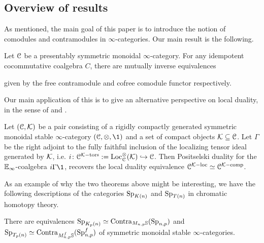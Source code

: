 \subsection*{Overview of results}

As mentioned, the main goal of this paper is to introduce the notion of comodules and contramodules in $\infty$-categories. Our main result is the following. 

\begin{introthm}
    \label{ch2:introthm:A}
    Let $\EuScript{C}$ be a presentably symmetric monoidal $\infty$-category. For any idempotent cocommutative coalgebra $C$, there are mutually inverse equivalences
    \begin{center}
    \end{center}
    given by the free contramodule and cofree comodule functor respectively. 
\end{introthm}

Our main application of this is to give an alternative perspective on local duality, in the sense of \cite{hovey-palmiery-strickland_97} and \cite{barthel-heard-valenzuela_2018}. 

\begin{introthm}
    \label{ch2:introthm:B}
    Let $(\EuScript{C}, \mathcal{K})$ be a pair consisting of a rigidly compactly generated symmetric monoidal stable $\infty$-category $(\C, \otimes, \1)$ and a set of compact objects $\mathcal{K}\subseteq \EuScript{C}$. Let $\Gamma$ be the right adjoint to the fully faithful inclusion of the localizing tensor ideal generated by $\mathcal{K}$, i.e. $i\colon\EuScript{C}^{\mathcal{K}-\mathrm{tors}}:= \operatorname{Loc}_{\EuScript{C}}^\otimes (\mathcal{K})\hookrightarrow \EuScript{C}$. Then Positselski duality for the $\mathbb{E}_\infty$-coalgebra $i\Gamma \1$, recovers the local duality equivalence $\EuScript{C}^{\mathcal{K}-\mathrm{loc}} \simeq \EuScript{C}^{\mathcal{K}-\mathrm{comp}}$. 
\end{introthm}

As an example of why the two theorems above might be interesting, we have the following descriptions of the categories $\mathrm{Sp}_{K(n)}$ and $\mathrm{Sp}_{T(n)}$ in chromatic homotopy theory. 

\begin{introcor}
    There are equivalences $\mathrm{Sp}_{{K_p(n)}}\simeq \mathrm{Contra}_{M_{n,p}\mathbb{S}}(\mathrm{Sp}_{n,p})$ and $\mathrm{Sp}_{T_p(n)}\simeq \mathrm{Contra}_{M_{n,p}^f \mathbb{S}}(\mathrm{Sp}_{n,p}^f)$ of symmetric monoidal stable $\infty$-categories. 
\end{introcor}



